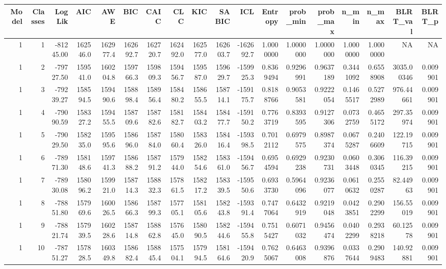 \documentclass[man]{apa6}
\begin{document}
\begin{tabular}{r|r|r|r|r|r|r|r|r|r|r|r|r|r|r|r|r|r}
\hline
Model & Classes & LogLik & AIC & AWE & BIC & CAIC & CLC & KIC & SABIC & ICL & Entropy & prob\_min & prob\_max & n\_min & n\_max & BLRT\_val & BLRT\_p\\
\hline
1 & 1 & -81245.00 & 162546.0 & 162977.4 & 162692.7 & 162720.7 & 162492.0 & 162577.0 & 162603.7 & -162692.7 & 1.0000000 & 1.0000000 & 1.0000000 & 1.0000000 & 1.0000000 & NA & NA\\
\hline
1 & 2 & -79727.50 & 159541.0 & 160204.8 & 159766.3 & 159809.3 & 159456.7 & 159587.0 & 159629.7 & -159925.3 & 0.8369494 & 0.9296991 & 0.9637189 & 0.3441092 & 0.6558908 & 3035.00346 & 0.009901\\
\hline
1 & 3 & -79239.27 & 158594.5 & 159490.6 & 158898.4 & 158956.4 & 158480.2 & 158655.5 & 158714.1 & -159175.7 & 0.8188766 & 0.9053581 & 0.9222054 & 0.1465517 & 0.5272989 & 976.44661 & 0.009901\\
\hline
1 & 4 & -79090.59 & 158327.2 & 159455.5 & 158709.6 & 158782.6 & 158182.7 & 158403.2 & 158477.7 & -159150.2 & 0.7763719 & 0.8393595 & 0.9127306 & 0.0732759 & 0.4655172 & 297.35974 & 0.009901\\
\hline
1 & 5 & -79029.50 & 158235.0 & 159595.6 & 158696.0 & 158784.0 & 158060.4 & 158326.0 & 158416.4 & -159398.5 & 0.7012112 & 0.6979575 & 0.8987374 & 0.0675287 & 0.2406609 & 122.19715 & 0.009901\\
\hline
1 & 6 & -78971.30 & 158148.6 & 159741.3 & 158688.2 & 158791.2 & 157944.0 & 158254.6 & 158361.0 & -159456.7 & 0.6954594 & 0.6929238 & 0.9230731 & 0.0603448 & 0.3060345 & 116.39215 & 0.009901\\
\hline
1 & 7 & -78930.08 & 158096.2 & 159921.0 & 158714.3 & 158832.3 & 157861.5 & 158217.2 & 158339.5 & -159550.6 & 0.6933730 & 0.5964096 & 0.9236077 & 0.0610632 & 0.2550287 & 82.44963 & 0.009901\\
\hline
1 & 8 & -78851.80 & 157969.6 & 160026.5 & 158666.3 & 158799.3 & 157705.1 & 158105.6 & 158243.8 & -159391.4 & 0.7477064 & 0.6432919 & 0.9219048 & 0.0423851 & 0.2902299 & 156.55019 & 0.009901\\
\hline
1 & 9 & -78821.74 & 157939.5 & 160228.6 & 158714.8 & 158862.8 & 157645.0 & 158090.5 & 158244.6 & -159455.8 & 0.7515427 & 0.6071032 & 0.9456474 & 0.0402299 & 0.2938218 & 60.12578 & 0.009901\\
\hline
1 & 10 & -78751.27 & 157828.5 & 160349.8 & 158682.4 & 158845.4 & 157504.1 & 157994.5 & 158164.6 & -159420.9 & 0.7625067 & 0.6463008 & 0.9396876 & 0.0337644 & 0.2909483 & 140.92881 & 0.009901\\
\hline
\end{tabular}
\end{document}
